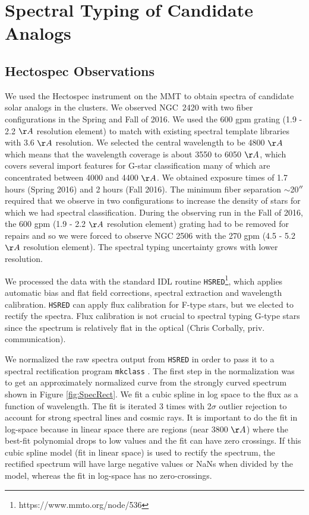 \documentclass{aastex6}
\begin{document}
\clearpage
\section{Spectral Typing of Candidate Analogs}

\subsection{Hectospec Observations}

We used the Hectospec instrument on the MMT \citep{fabricant2005hectospec,mink2007hectoFibers} to obtain spectra of candidate solar analogs in the clusters.
We observed NGC~2420 with two fiber configurations in the Spring and Fall of 2016.
We used the 600 gpm grating (1.9 - 2.2 $\AA$ resolution element) to match with existing spectral template libraries with 3.6 $\AA$ resolution.
We selected the central wavelength to be 4800 $\AA$ which means that the wavelength coverage is about 3550 to 6050 $\AA$, which covers several import features for G-star classification many of which are concentrated between 4000 and 4400 $\AA$.
We obtained exposure times of 1.7 hours (Spring 2016) and 2 hours (Fall 2016).
The minimum fiber separation $\sim$20$\mbox{$^{\prime\prime}$}$ required that we observe in two configurations to increase the density of stars for which we had spectral classification.
During the observing run in the Fall of 2016, the 600 gpm (1.9 - 2.2 $\AA$ resolution element) grating had to be removed for repairs and so we were forced to observe NGC 2506 with the 270 gpm (4.5 - 5.2 $\AA$ resolution element).
The spectral typing uncertainty grows with lower resolution.

We processed the data with the standard IDL routine \texttt{HSRED}\footnote{https://www.mmto.org/node/536}, which applies automatic bias and flat field corrections, spectral extraction and wavelength calibration.
\texttt{HSRED} can apply flux calibration for F-type stars, but we elected to rectify the spectra.
Flux calibration is not crucial to spectral typing G-type stars since the spectrum is relatively flat in the optical (Chris Corbally, priv. communication).

We normalized the raw spectra output from \texttt{HSRED} in order to pass it to a spectral rectification program \texttt{mkclass} \citep{gray2014classification}.
The first step in the normalization was to get an approximately normalized curve from the strongly curved spectrum shown in Figure \ref{fig:SpecRect}.
We fit a cubic spline in log space to the flux as a function of wavelength.
The fit is iterated 3 times with 2$\sigma$ outlier rejection to account for strong spectral lines and cosmic rays.
It is important to do the fit in log-space because in linear space there are regions (near 3800 $\AA$) where the best-fit polynomial drops to low values and the fit can have zero crossings.
If this cubic spline model (fit in linear space) is used to rectify the spectrum, the rectified spectrum will have large negative values or NaNs when divided by the model, whereas the fit in log-space has no zero-crossings.
\end{document}
